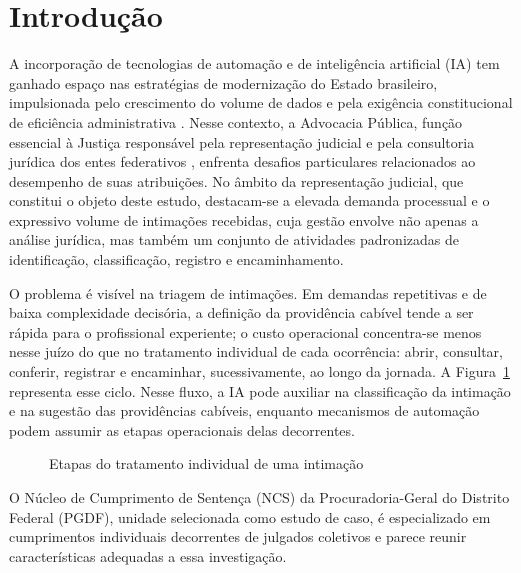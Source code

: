 
\section{Introdução}

A incorporação de tecnologias de automação e de inteligência artificial (IA)
tem ganhado espaço nas estratégias de modernização do Estado brasileiro,
impulsionada pelo crescimento do volume de dados e pela exigência
constitucional de eficiência administrativa \parencite[art.~37,
caput]{brasil1988}. Nesse contexto, a Advocacia Pública, função essencial à
Justiça responsável pela representação judicial e pela consultoria jurídica
dos entes federativos \parencite[arts.~131 e 132]{brasil1988}, enfrenta
desafios particulares relacionados ao desempenho de suas atribuições. No
âmbito da representação judicial, que constitui o objeto deste estudo,
destacam-se a elevada demanda processual e o expressivo volume de intimações
recebidas, cuja gestão envolve não apenas a análise jurídica, mas também um
conjunto de atividades padronizadas de identificação, classificação, registro
e encaminhamento.

O problema é visível na triagem de intimações. Em demandas repetitivas e de
baixa complexidade decisória, a definição da providência cabível tende a ser
rápida para o profissional experiente; o custo operacional concentra-se menos
nesse juízo do que no tratamento individual de cada ocorrência: abrir,
consultar, conferir, registrar e encaminhar, sucessivamente, ao longo da
jornada. A Figura~\ref{fig:ciclo-intimacao} representa esse ciclo. Nesse
fluxo, a IA pode auxiliar na classificação da intimação e na sugestão das
providências cabíveis, enquanto mecanismos de automação podem assumir as
etapas operacionais delas decorrentes.

\begin{figure}[htb]
  \caption{Etapas do tratamento individual de uma intimação}
  \label{fig:ciclo-intimacao}
  \centering
\end{figure}

O Núcleo de Cumprimento de Sentença (NCS) da Procuradoria-Geral do Distrito
Federal (PGDF), unidade selecionada como estudo de caso, é especializado em
cumprimentos individuais decorrentes de julgados coletivos e parece reunir
características adequadas a essa investigação.
